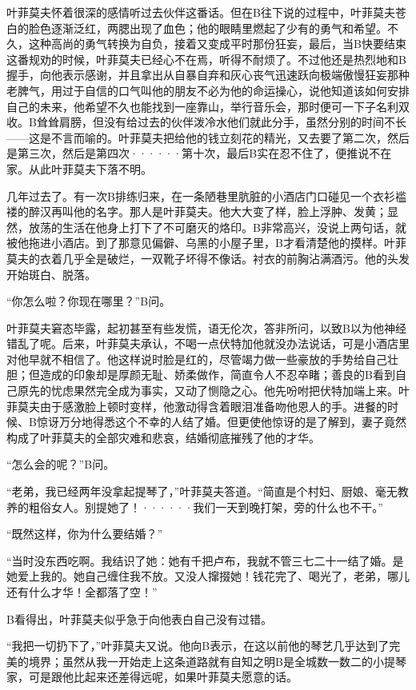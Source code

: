 \documentclass[12pt, UTF8]{ctexbook}
\begin{document}
\par 叶菲莫夫怀着很深的感情听过去伙伴这番话。但在B往下说的过程中，叶菲莫夫苍白的脸色逐渐泛红，两腮出现了血色；他的眼睛里燃起了少有的勇气和希望。不久，这种高尚的勇气转换为自负，接着又变成平时那份狂妄，最后，当B快要结束这番规劝的时候，叶菲莫夫已经心不在焉，听得不耐烦了。不过他还是热烈地和B握手，向他表示感谢，并且拿出从自暴自弃和灰心丧气迅速跃向极端傲慢狂妄那种老脾气，用过于自信的口气叫他的朋友不必为他的命运操心，说他知道该如何安排自己的未来，他希望不久也能找到一座靠山，举行音乐会，那时便可一下子名利双收。B耸耸肩膀，但没有给过去的伙伴泼冷水他们就此分手，虽然分别的时间不长——这是不言而喻的。叶菲莫夫把给他的钱立刻花的精光，又去要了第二次，然后是第三次，然后是第四次······第十次，最后B实在忍不住了，便推说不在家。从此叶菲莫夫下落不明。
\par 几年过去了。有一次B排练归来，在一条陋巷里肮脏的小酒店门口碰见一个衣衫褴褛的醉汉再叫他的名字。那人是叶菲莫夫。他大大变了样，脸上浮肿、发黄；显然，放荡的生活在他身上打下了不可磨灭的烙印。B非常高兴，没说上两句话，就被他拖进小酒店。到了那意见偏僻、乌黑的小屋子里，B才看清楚他的摸样。叶菲莫夫的衣着几乎全是破烂，一双靴子坏得不像话。衬衣的前胸沾满酒污。他的头发开始斑白、脱落。
\par “你怎么啦？你现在哪里？”B问。
\par 叶菲莫夫窘态毕露，起初甚至有些发慌，语无伦次，答非所问，以致B以为他神经错乱了呢。后来，叶菲莫夫承认，不喝一点伏特加他就没办法说话，可是小酒店里对他早就不相信了。他这样说时脸是红的，尽管竭力做一些豪放的手势给自己壮胆；但造成的印象却是厚颜无耻、娇柔做作，简直令人不忍卒睹；善良的B看到自己原先的忧虑果然完全成为事实，又动了恻隐之心。他先吩咐把伏特加端上来。叶菲莫夫由于感激脸上顿时变样，他激动得含着眼泪准备吻他恩人的手。进餐的时候、B惊讶万分地得悉这个不幸的人结了婚。但更使他惊讶的是了解到，妻子竟然构成了叶菲莫夫的全部灾难和悲哀，结婚彻底摧残了他的才华。
\par “怎么会的呢？”B问。
\par “老弟，我已经两年没拿起提琴了，”叶菲莫夫答道。“简直是个村妇、厨娘、毫无教养的粗俗女人。别提她了！······我们一天到晚打架，旁的什么也不干。”
\par “既然这样，你为什么要结婚？”
\par “当时没东西吃啊。我结识了她：她有千把卢布，我就不管三七二十一结了婚。是她爱上我的。她自己缠住我不放。又没人撺掇她！钱花完了、喝光了，老弟，哪儿还有什么才华！全都落了空！”
\par B看得出，叶菲莫夫似乎急于向他表白自己没有过错。
\par “我把一切扔下了，”叶菲莫夫又说。他向B表示，在这以前他的琴艺几乎达到了完美的境界；虽然从我一开始走上这条道路就有自知之明B是全城数一数二的小提琴家，可是跟他比起来还差得远呢，如果叶菲莫夫愿意的话。
\end{document}
